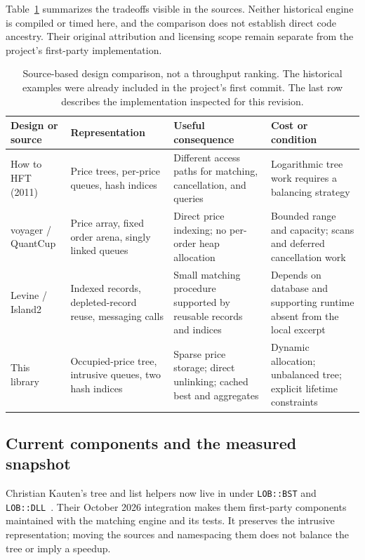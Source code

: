 \documentclass[10pt,letterpaper,twocolumn]{article}
\newcommand{\code}[1]{\texttt{#1}}
\begin{document}
Table~\ref{tab:design-context} summarizes the tradeoffs visible in the sources.
Neither historical engine is compiled or timed here, and the comparison does
not establish direct code ancestry. Their original attribution and licensing
scope remain separate from the project's first-party implementation.

\begin{table}[t]
\centering\small
\begin{tabularx}{\textwidth}{@{}>{\raggedright\arraybackslash}p{}
 *{3}{>{\raggedright\arraybackslash}X}@{}}
\toprule
Design or source & Representation & Useful consequence & Cost or condition\\
\midrule
How to HFT (2011) & Price trees, per-price queues, hash indices & Different
access paths for matching, cancellation, and queries & Logarithmic tree work
requires a balancing strategy\\
\addlinespace
voyager / QuantCup & Price array, fixed order arena, singly linked queues &
Direct price indexing; no per-order heap allocation & Bounded range and
capacity; scans and deferred cancellation work\\
\addlinespace
Levine / Island2 & Indexed records, depleted-record reuse, messaging calls &
Small matching procedure supported by reusable records and indices & Depends
on database and supporting runtime absent from the local excerpt\\
\addlinespace
This library & Occupied-price tree, intrusive queues, two hash indices &
Sparse price storage; direct unlinking; cached best and aggregates & Dynamic
allocation; unbalanced tree; explicit lifetime constraints\\
\bottomrule
\end{tabularx}
\caption{Source-based design comparison, not a throughput ranking. The
historical examples were already included in the project's first commit.
The last row describes the implementation inspected for this revision.}
\label{tab:design-context}
\end{table}

\subsection{Current components and the measured snapshot}
Christian Kauten's tree and list helpers now live in  under
\code{LOB::BST} and \code{LOB::DLL}~\cite{bst,dll}. Their October 2026
integration makes them first-party components maintained with the matching
engine and its tests. It preserves the intrusive representation; moving the
sources and namespacing them does not balance the tree or imply a speedup.
\end{document}
